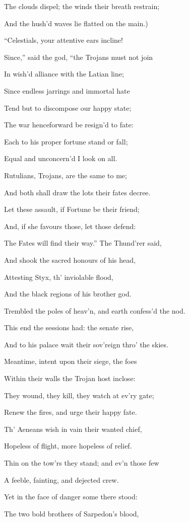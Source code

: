 The clouds dispel; the winds their breath restrain;

And the hush’d waves lie flatted on the main.)

“Celestials, your attentive ears incline!

Since,” said the god, “the Trojans must not join

In wish’d alliance with the Latian line;

Since endless jarrings and immortal hate

Tend but to discompose our happy state;

The war henceforward be resign’d to fate:

Each to his proper fortune stand or fall;

Equal and unconcern’d I look on all.

Rutulians, Trojans, are the same to me;

And both shall draw the lots their fates decree.

Let these assault, if Fortune be their friend;

And, if she favours those, let those defend:

The Fates will find their way.” The Thund’rer said,

And shook the sacred honours of his head,

Attesting Styx, th’ inviolable flood,

And the black regions of his brother god.

Trembled the poles of heav’n, and earth confess’d the nod.

This end the sessions had: the senate rise,

And to his palace wait their sov’reign thro’ the skies.

Meantime, intent upon their siege, the foes

Within their walls the Trojan host inclose:

They wound, they kill, they watch at ev’ry gate;

Renew the fires, and urge their happy fate.

Th’ Aeneans wish in vain their wanted chief,

Hopeless of flight, more hopeless of relief.

Thin on the tow’rs they stand; and ev’n those few

A feeble, fainting, and dejected crew.

Yet in the face of danger some there stood:

The two bold brothers of Sarpedon’s blood,

